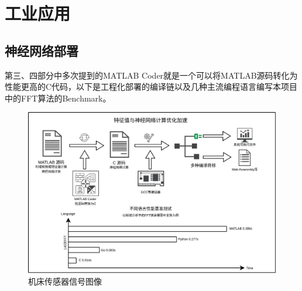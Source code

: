\chapter{工业应用}
\section{神经网络部署}
% 
第三、四部分中多次提到的MATLAB Coder就是一个可以将MATLAB源码转化为性能更高的C代码，以下是工程化部署的编译链以及几种主流编程语言编写本项目中的FFT算法的Benchmark。\par
\begin{figure}[htp]
    \centering
    \includegraphics[width=14cm]{Chapter5/compile_chain.jpg}
    \caption{机床传感器信号图像}
\end{figure}
% 
% 
% 
